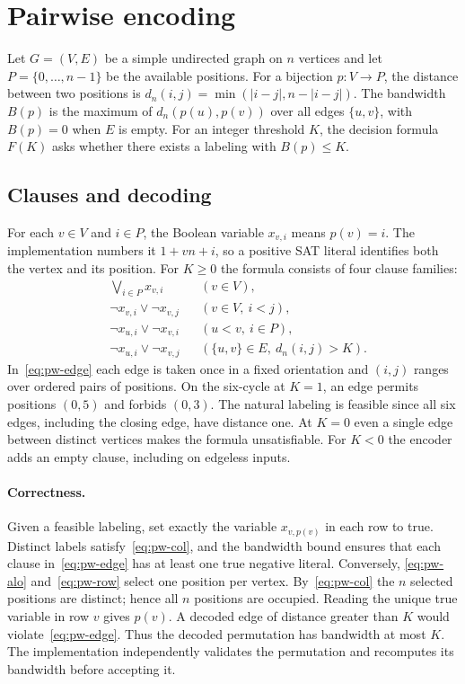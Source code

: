 \section{Pairwise encoding}
\label{sec:pairwise}

Let $G=(V,E)$ be a simple undirected graph on $n$ vertices and let
$P=\{0,\ldots,n-1\}$ be the available positions. For a bijection $p:V\to P$,
the distance between two positions is
$d_n(i,j)=\min(|i-j|,n-|i-j|)$. The bandwidth $B(p)$ is the maximum of
$d_n(p(u),p(v))$ over all edges $\{u,v\}$, with $B(p)=0$ when $E$ is empty.
For an integer threshold $K$, the decision formula $F(K)$ asks whether
there exists a labeling with $B(p)\le K$.

\subsection{Clauses and decoding}
For each $v\in V$ and $i\in P$, the Boolean variable $x_{v,i}$ means
$p(v)=i$. The implementation numbers it $1+vn+i$, so a positive SAT
literal identifies both the vertex and its position. For $K\ge 0$ the
formula consists of four clause families:
\begin{align}
&\bigvee_{i\in P}x_{v,i}
    && (v\in V), \label{eq:pw-alo}\\
&\neg x_{v,i}\lor\neg x_{v,j}
    && (v\in V,\ i<j), \label{eq:pw-row}\\
&\neg x_{u,i}\lor\neg x_{v,i}
    && (u<v,\ i\in P), \label{eq:pw-col}\\
&\neg x_{u,i}\lor\neg x_{v,j}
    && (\{u,v\}\in E,\ d_n(i,j)>K). \label{eq:pw-edge}
\end{align}
In~\eqref{eq:pw-edge} each edge is taken once in a fixed orientation and
$(i,j)$ ranges over ordered pairs of positions. On the six-cycle at $K=1$,
an edge permits positions $(0,5)$ and forbids $(0,3)$. The natural
labeling is feasible since all six edges, including the closing edge, have
distance one. At $K=0$ even a single edge between distinct vertices makes
the formula unsatisfiable. For $K<0$ the encoder adds an empty clause,
including on edgeless inputs.

\paragraph{Correctness.}
Given a feasible labeling, set exactly the variable $x_{v,p(v)}$ in each
row to true. Distinct labels satisfy~\eqref{eq:pw-col}, and the bandwidth
bound ensures that each clause in~\eqref{eq:pw-edge} has at least one true negative literal.
Conversely, \eqref{eq:pw-alo} and~\eqref{eq:pw-row} select one position
per vertex. By~\eqref{eq:pw-col} the $n$ selected positions are distinct;
hence all $n$ positions are occupied. Reading the unique true variable in
row $v$ gives $p(v)$. A decoded edge of distance greater than $K$ would
violate~\eqref{eq:pw-edge}. Thus the decoded permutation has bandwidth at
most $K$. The implementation independently validates the permutation and
recomputes its bandwidth before accepting it.

